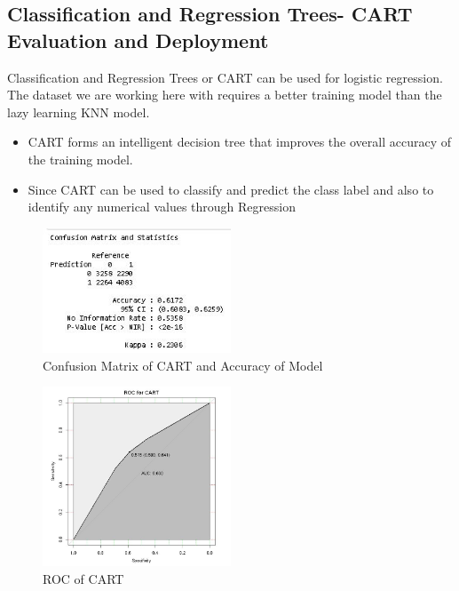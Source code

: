 \documentclass[sigchi]{acmart}
\begin{document}
\subsection{Classification and Regression Trees- CART Evaluation and Deployment}

Classification and Regression Trees or CART can be used for logistic regression. The dataset we are working here with requires a better training model than the lazy learning KNN model.

\begin{itemize}
    \item CART forms an intelligent decision tree that improves the overall accuracy of the training model.
    \item Since CART can be used to classify and predict the class label and also to identify any numerical values through Regression
\end{itemize}
\begin{figure}[h!]
    \caption{Confusion Matrix of CART and Accuracy of Model}
    \centering
    \includegraphics[width=0.50\textwidth]{ConfusionMatrixand Accuracy of CART.JPG}
\end{figure} 

\begin{figure}[h!]
    \caption{ROC of CART}
    \centering
    \includegraphics[width=0.50\textwidth]{ROCofCART.JPG}
\end{figure}
\end{document}
